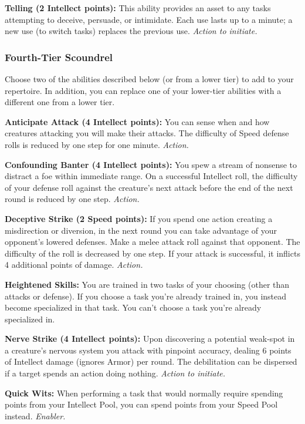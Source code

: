 \documentclass[a4paper,10pt,final,twocolumn,oneside]{book}
\newcommand{\itemAbility}[2]{\textcolor{25gray}{\textbullet\textbf{ #1:}}{ #2}\par}
\newcommand{\enabler}{\textit{ Enabler.}}
\newcommand{\action}{\textit{ Action.}}
\newcommand{\actionInit}{\textit{ Action to initiate.}}
\begin{document}
\itemAbility{Telling (2 Intellect points)}{This ability provides an asset to any tasks attempting to deceive, persuade, or intimidate. Each use lasts up to a minute; a new use (to switch tasks) replaces the previous use.\actionInit}


\subsubsection*{Fourth-Tier Scoundrel}
\label{subsub:scoundrelFourthTier}

Choose two of the abilities described below (or from a lower tier) to add to your repertoire. In addition, you can replace one of your lower-tier abilities with a different one from a lower tier.

\itemAbility{Anticipate Attack (4 Intellect points)}{You can sense when and how creatures attacking you will make their attacks. The difficulty of Speed defense rolls is reduced by one step for one minute.\action}

\itemAbility{Confounding Banter (4 Intellect points)}{You spew a stream of nonsense to distract a foe within immediate range. On a successful Intellect roll, the difficulty of your defense roll against the creature’s next attack before the end of the next round is reduced by one step.\action}

\itemAbility{Deceptive Strike (2 Speed points)}{If you spend one action creating a misdirection or diversion, in the next round you can take advantage of your opponent’s lowered defenses. Make a melee attack roll against that opponent. The difficulty of the roll is decreased by one step. If your attack is successful, it inflicts 4 additional points of damage.\action}

\itemAbility{Heightened Skills}{You are trained in two tasks of your choosing (other than attacks or defense). If you choose a task you’re already trained in, you instead become specialized in that task. You can’t choose a task you’re already specialized in.}

\itemAbility{Nerve Strike (4 Intellect points)}{Upon discovering a potential weak-spot in a creature's nervous system you attack with pinpoint accuracy, dealing 6 points of Intellect damage (ignores Armor) per round. The debilitation can be dispersed if a target spends an action doing nothing.\actionInit}

\itemAbility{Quick Wits}{When performing a task that would normally require spending points from your Intellect Pool, you can spend points from your Speed Pool instead.\enabler}
\end{document}
